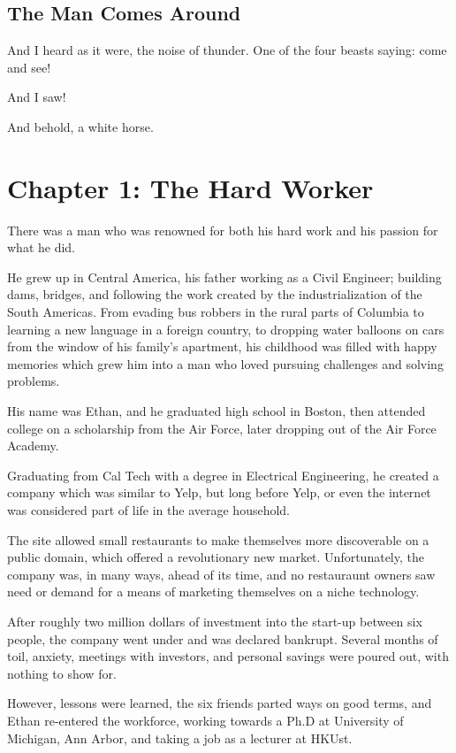 \documentclass[a4paper,12pt,twoside]{book}
\begin{document}
\section{The Man Comes Around}
And I heard as it were, the noise of thunder.  One of the four beasts saying: come and see!
 
And I saw! 
 
And behold, a white horse.
 
\chapter{Chapter 1: The Hard Worker}
There was a man who was renowned for both his hard work and his passion for what he did.  

He grew up in Central America, his father working as a Civil Engineer; building dams, bridges, and following the work created by the industrialization of the South Americas.  From evading bus robbers in the rural parts of Columbia to learning a new language in a foreign country, to dropping water balloons on cars from the window of his family's apartment, his childhood was filled with happy memories which grew him into a man who loved pursuing challenges and solving problems.

His name was Ethan, and he graduated high school in Boston, then attended college on a scholarship from the Air Force, later dropping out of the Air Force Academy.

Graduating from Cal Tech with a degree in Electrical Engineering, he created a company which was similar to Yelp, but long before Yelp, or even the internet was considered part of life in the average household.  

The site allowed small restaurants to make themselves more discoverable on a public domain, which offered a revolutionary new market.  Unfortunately, the company was, in many ways, ahead of its time, and no restauraunt owners saw need or demand for a means of marketing themselves on a niche technology. 

After roughly two million dollars of investment into the start-up between six people, the company went under and was declared bankrupt.  Several months of toil, anxiety, meetings with investors, and personal savings were poured out, with nothing to show for.

However, lessons were learned, the six friends parted ways on good terms, and Ethan re-entered the workforce, working towards a Ph.D at University of Michigan, Ann Arbor, and taking a job as a lecturer at HKUst.
\end{document}
